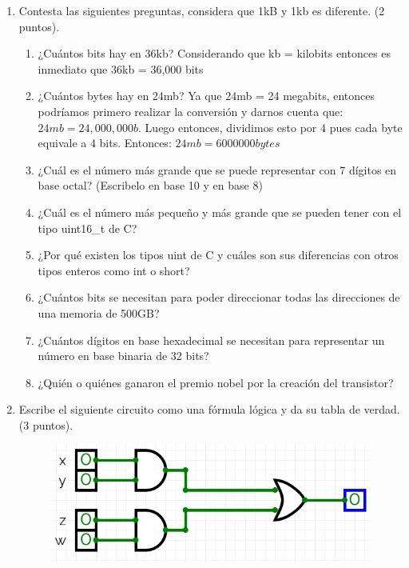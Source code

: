 \documentclass[12pt,letterpaper]{article}
\begin{document}
\begin{enumerate}
    \item Contesta las siguientes preguntas, considera que 1kB y 1kb es diferente. (2 puntos).

    \begin{enumerate}
        \item ¿Cuántos bits hay en 36kb?
          Considerando que kb = kilobits entonces es inmediato que 36kb = 36,000 bits
        \item ¿Cuántos bytes hay en 24mb?
          Ya que 24mb = 24 megabits, entonces podríamos primero realizar la conversión y darnos cuenta que:
          $24mb = 24,000,000 b$. Luego entonces, dividimos esto por 4 pues cada byte equivale a 4 bits. Entonces: $24mb = 6000000 bytes$
        \item ¿Cuál es el número más grande que se puede representar con 7 dígitos en base octal? (Escribelo en base 10 y en base 8)
        \item ¿Cuál es el número más pequeño y más grande que se pueden tener con el tipo uint16\_t de C?
        \item ¿Por qué existen los tipos uint de C y cuáles son sus diferencias con otros tipos enteros como int o short?
        \item ¿Cuántos bits se necesitan para poder direccionar todas las direcciones de una memoria de 500GB?
        \item ¿Cuántos dígitos en base hexadecimal se necesitan para representar un número en base binaria de 32 bits?
        \item ¿Quién o quiénes ganaron el premio nobel por la creación del transistor?
    \end{enumerate}


    \item  Escribe el siguiente circuito como una fórmula lógica y da su tabla de verdad. (3 puntos).
    \begin{figure}[H]
        \centering
        \includegraphics[width=0.75\linewidth]{circuito.png}
    \end{figure}


\end{enumerate}
\end{document}
